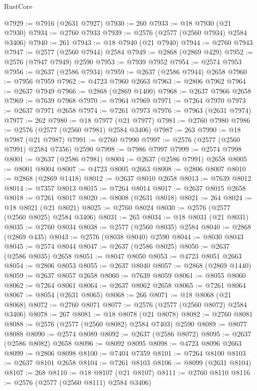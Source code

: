 \begin{lexlean}{RustCore}
\begin{coremodule}
@7929 := @7916 (@2631 @7927)
@7930 := 260
@7933 := @18 @7930 (@21 @7930)
@7934 := @2760 @7933
@7939 := @2576 (@2577 (@2560 @7934) @2584 @3406)
@7940 := 261
@7943 := @18 @7940 (@21 @7940)
@7944 := @2760 @7943
@7947 := @2577 (@2560 @7944) @2584
@7949 := @2868 (@2869 @429)
@7952 := @2576 (@7947 @7949) @2590
@7953 := @7939 @7952
@7954 := @2574 @7953
@7956 := @2637 (@2586 @7934)
@7959 := @2637 (@2586 @7944) @2658
@7960 := @7956 @7959
@7962 := @4723 @7960 @2663
@7963 := @2806 @7962
@7964 := @2637 @7949
@7966 := @2868 (@2869 @1400)
@7968 := @2637 @7966 @2658
@7969 := @7639 @7968
@7970 := @7964 @7969
@7971 := @7264 @7970
@7973 := @2637 @7971 @2658
@7974 := @7261 @7973
@7976 := @7963 (@2631 @7974)
@7977 := 262
@7980 := @18 @7977 (@21 @7977)
@7981 := @2760 @7980
@7986 := @2576 (@2577 (@2560 @7981) @2584 @3406)
@7987 := 263
@7990 := @18 @7987 (@21 @7987)
@7991 := @2760 @7990
@7997 := @2576 (@2577 (@2560 @7991) @2584 @7356) @2590
@7998 := @7986 @7997
@7999 := @2574 @7998
@8001 := @2637 (@2586 @7981)
@8004 := @2637 (@2586 @7991) @2658
@8005 := @8001 @8004
@8007 := @4723 @8005 @2663
@8008 := @2806 @8007
@8010 := @2868 (@2869 @1418)
@8012 := @2637 @8010 @2658
@8013 := @7639 @8012
@8014 := @7357 @8013
@8015 := @7264 @8014
@8017 := @2637 @8015 @2658
@8018 := @7261 @8017
@8020 := @8008 (@2631 @8018)
@8021 := 264
@8024 := @18 @8021 (@21 @8021)
@8025 := @2760 @8024
@8030 := @2576 (@2577 (@2560 @8025) @2584 @3406)
@8031 := 265
@8034 := @18 @8031 (@21 @8031)
@8035 := @2760 @8034
@8038 := @2577 (@2560 @8035) @2584
@8040 := @2868 (@2869 @435)
@8043 := @2576 (@8038 @8040) @2590
@8044 := @8030 @8043
@8045 := @2574 @8044
@8047 := @2637 (@2586 @8025)
@8050 := @2637 (@2586 @8035) @2658
@8051 := @8047 @8050
@8053 := @4723 @8051 @2663
@8054 := @2806 @8053
@8055 := @2637 @8040
@8057 := @2868 (@2869 @1440)
@8059 := @2637 @8057 @2658
@8060 := @7639 @8059
@8061 := @8055 @8060
@8062 := @7264 @8061
@8064 := @2637 @8062 @2658
@8065 := @7261 @8064
@8067 := @8054 (@2631 @8065)
@8068 := 266
@8071 := @18 @8068 (@21 @8068)
@8072 := @2760 @8071
@8077 := @2576 (@2577 (@2560 @8072) @2584 @3406)
@8078 := 267
@8081 := @18 @8078 (@21 @8078)
@8082 := @2760 @8081
@8088 := @2576 (@2577 (@2560 @8082) @2584 @7403) @2590
@8089 := @8077 @8088
@8090 := @2574 @8089
@8092 := @2637 (@2586 @8072)
@8095 := @2637 (@2586 @8082) @2658
@8096 := @8092 @8095
@8098 := @4723 @8096 @2663
@8099 := @2806 @8098
@8100 := @7404 @7359
@8101 := @7264 @8100
@8103 := @2637 @8101 @2658
@8104 := @7261 @8103
@8106 := @8099 (@2631 @8104)
@8107 := 268
@8110 := @18 @8107 (@21 @8107)
@8111 := @2760 @8110
@8116 := @2576 (@2577 (@2560 @8111) @2584 @3406)

\end{coremodule}
\end{lexlean}

